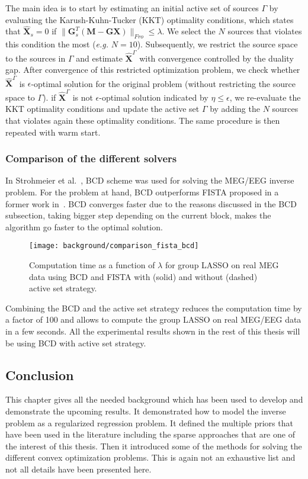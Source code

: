 The main idea is to start by estimating an initial active set of sources $\Gamma$ by evaluating the Karush-Kuhn-Tucker (KKT) optimality conditions, which states that $\hat{\mathbf{X}}_s=0$ if $\|\mathbf{G}^T_s(\mathbf{M}-\mathbf{GX})\|_{Fro}\leq\lambda$. We select the $N$ sources that violates this condition the most (\textit{e.g.} $N=10$). Subsequently, we restrict the source space to the sources in $\Gamma$ and estimate $\hat{\mathbf{X}}^{\Gamma}$ with convergence controlled by the duality gap. After convergence of this restricted optimization problem, we check whether $\hat{\mathbf{X}}^{\Gamma}$ is $\epsilon$-optimal solution for the original problem (without restricting the source space to $\Gamma$). if $\hat{\mathbf{X}}^{\Gamma}$ is not $\epsilon$-optimal solution indicated by $\eta \leq \epsilon$, we re-evaluate the KKT optimality conditions and update the active set $\Gamma$ by adding the $N$ sources that violates again these optimality conditions. The same procedure is then repeated with warm start.


\subsubsection*{Comparison of the different solvers}
In Strohmeier et al.~\cite{strohmeier-etal:16}, BCD scheme was used for solving the MEG/EEG inverse problem. For the problem at hand, BCD outperforms FISTA proposed in a former work in~\cite{gramfort2012mixed}. BCD converges faster due to the reasons discussed in the BCD subsection, taking bigger step depending on the current block, makes the algorithm go faster to the optimal solution.

\begin{figure}
	\centering
	\texttt{[image: background/comparison\_fista\_bcd]}
    \caption{Computation time as a function of $\lambda$ for group LASSO on real MEG data using BCD and FISTA with (solid) and without (dashed) active set strategy.}
    \label{fig:comparison_fista_bcd}
\end{figure}
Combining the BCD and the active set strategy reduces the computation time by a factor of 100 and allows to compute the group LASSO on real MEG/EEG data in a few seconds. All the experimental results shown in the rest of this thesis will be using BCD with active set strategy.

\subsection{Conclusion}
This chapter gives all the needed background which has been used to develop and demonstrate the upcoming results. It demonstrated how to model the inverse problem as a regularized regression problem. It defined the multiple priors that have been used in the literature including the sparse approaches that are one of the interest of this thesis. Then it introduced some of the methods for solving the different convex optimization problems. This is again not an exhaustive list and not all details have been presented here. 

